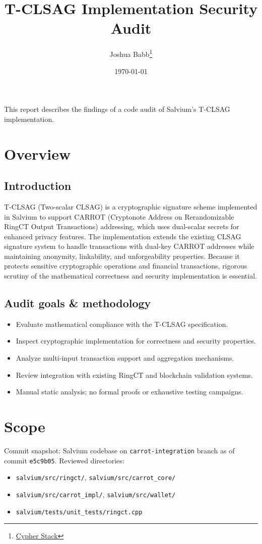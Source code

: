 \documentclass{article}
\title{T-CLSAG Implementation Security Audit}
\author{Joshua Babb\thanks{\url{Cypher Stack}}}
\date{\today}
\begin{document}
\maketitle

This report describes the findings of a code audit of Salvium's T-CLSAG implementation.

\tableofcontents

\section{Overview}
\subsection{Introduction}
T-CLSAG (Two-scalar CLSAG) is a cryptographic signature scheme implemented in 
Salvium to support CARROT (Cryptonote Address on Rerandomizable RingCT Output Transactions) addressing, which uses dual-scalar secrets for enhanced 
privacy features.  The implementation extends the existing CLSAG signature system 
to handle transactions with dual-key CARROT addresses while maintaining anonymity, 
linkability, and unforgeability properties.  Because it protects sensitive 
cryptographic operations and financial transactions, rigorous scrutiny of the 
mathematical correctness and security implementation is essential.

\subsection{Audit goals \& methodology}
\begin{itemize}
  \item Evaluate mathematical compliance with the T-CLSAG specification.
  \item Inspect cryptographic implementation for correctness and security properties.
  \item Analyze multi-input transaction support and aggregation mechanisms.
  \item Review integration with existing RingCT and blockchain validation systems.
  \item Manual static analysis; no formal proofs or exhaustive testing campaigns.
\end{itemize}

\section{Scope}
Commit snapshot: Salvium codebase on \texttt{carrot-integration} branch as of commit \texttt{e5c9b05}.  Reviewed directories:
\begin{itemize}
  \item \texttt{salvium/src/ringct/}, \texttt{salvium/src/carrot\_core/}
  \item \texttt{salvium/src/carrot\_impl/}, \texttt{salvium/src/wallet/}
  \item \texttt{salvium/tests/unit\_tests/ringct.cpp}
\end{itemize}
\end{document}

